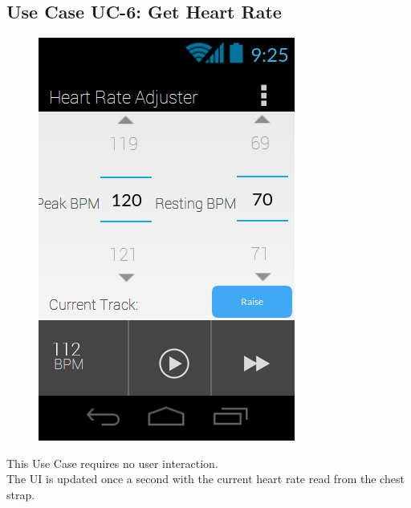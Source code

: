 \documentclass[letterpaper,english, 12pt]{scrreprt}
\begin{document}
\subsection{Use Case UC-6: Get Heart Rate}
\begin{figure}[H]
	\centering
	\includegraphics{img/mobile_ui/1.png}\\
\end{figure}

This Use Case requires no user interaction.\\
The UI is updated once a second with the current heart rate read from the chest strap.
\end{document}
